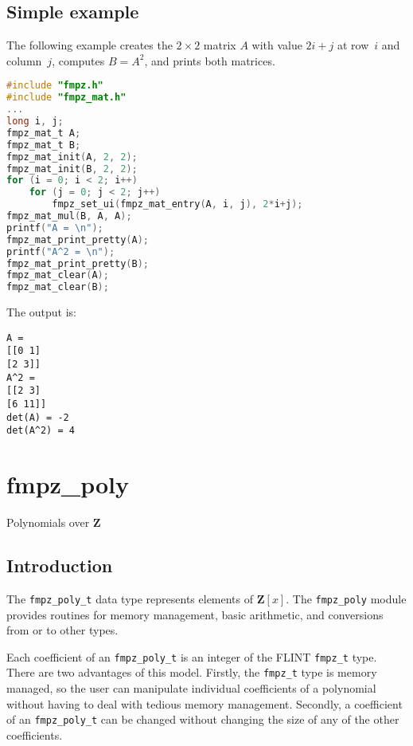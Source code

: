 \documentclass[a4paper,10pt]{book}
\newcommand{\Z}{\mathbf{Z}}%
\newcommand{\code}{\lstinline}
\begin{document}
\section{Simple example}
The following example creates the $2 \times 2$ matrix $A$ with
value $2i+j$ at row~$i$ and column~$j$, computes $B = A^2$,
and prints both matrices.

\begin{lstlisting}[language=c]
#include "fmpz.h"
#include "fmpz_mat.h"
...
long i, j;
fmpz_mat_t A;
fmpz_mat_t B;
fmpz_mat_init(A, 2, 2);
fmpz_mat_init(B, 2, 2);
for (i = 0; i < 2; i++)
    for (j = 0; j < 2; j++)
        fmpz_set_ui(fmpz_mat_entry(A, i, j), 2*i+j);
fmpz_mat_mul(B, A, A);
printf("A = \n");
fmpz_mat_print_pretty(A);
printf("A^2 = \n");
fmpz_mat_print_pretty(B);
fmpz_mat_clear(A);
fmpz_mat_clear(B);
\end{lstlisting}

The output is:
\begin{lstlisting}
A = 
[[0 1]
[2 3]]
A^2 = 
[[2 3]
[6 11]]
det(A) = -2
det(A^2) = 4

\end{lstlisting}





\chapter{fmpz\_poly}
\epigraph{Polynomials over $\Z$}{}

\section{Introduction}

The \code{fmpz_poly_t} data type represents elements of $\Z[x]$. The 
\code{fmpz_poly} module provides routines for memory management, basic 
arithmetic, and conversions from or to other types.

Each coefficient of an \code{fmpz_poly_t} is an integer of the FLINT 
\code{fmpz_t} type.  There are two advantages of this model.  Firstly, 
the \code{fmpz_t} type is memory managed, so the user can manipulate 
individual coefficients of a polynomial without having to deal with 
tedious memory management.  Secondly, a coefficient of an 
\code{fmpz_poly_t} can be changed without changing the size of any 
of the other coefficients.
\end{document}
